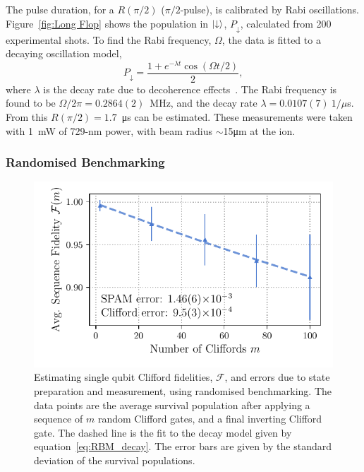     The pulse duration, for a $R(\pi/2)$ ($\pi/2$-pulse), is calibrated by Rabi oscillations. Figure~\ref{fig:Long Flop} shows the population in $\ket{\downarrow}$, $P_\downarrow$, calculated from 200 experimental shots.
    To find the Rabi frequency, $\Omega$, the data is fitted to a decaying oscillation model,
    \begin{equation}
        P_{\downarrow} = \frac{1 + e^{-\lambda t} \cos(\Omega t/2)}{2},
    \end{equation}
    where $\lambda$ is the decay rate due to decoherence
    effects~\cite{wineland1998experimental}. The Rabi frequency is found to be
    $\Omega/2\pi = 0.2864(2)$~\unit{\MHz}, and the decay rate $\lambda =
    0.0107(7)~1/\mu$s.
    From this $R(\pi/2) = 1.7$~\unit{\us} can be estimated.
    These measurements were taken with 1~mW of 729-nm power,
    with beam radius $\sim$15\unit{\um} at the ion.\\
    

\subsubsection{Randomised Benchmarking}

    \begin{figure}
        \begin{center}
        \noindent\includegraphics[width=0.75\linewidth]{
            figures/pdf_figure/rbm_fit.pdf
            }
        \end{center}
        \caption{
            Estimating single qubit Clifford fidelities, $\mathcal{F}$, and errors due to state preparation and measurement, using randomised benchmarking. 
            The data points are the average survival population after applying a sequence of $m$ random Clifford gates, and a final inverting Clifford gate. The dashed line is the fit to the decay model given by equation~\ref{eq:RBM_decay}. The error bars are given by the standard deviation of the survival populations.
            }
        \label{fig:rbm}
    \end{figure}

